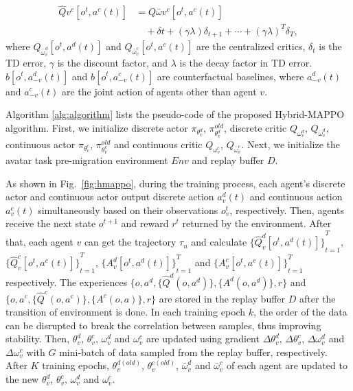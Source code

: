 \documentclass[lettersize,journal]{IEEEtran}
\begin{document}
\begin{equation}
\begin{aligned}
\hat{Q}v^c[o^t, a^c(t)] &= Q{\bar{\omega}v^c}[o^t, a^c(t)] \\
& \quad +\delta{t}+(\gamma \lambda) \delta_{t+1}+\cdots+(\gamma \lambda)^{T} \delta_{T},\label{hatqc}
\end{aligned}
\end{equation}
where $Q_{\bar{\omega}_v^d}[o^t, a^d(t)]$ and $Q_{\bar{\omega}_v^c}[o^t, a^c(t)]$ are the centralized critics, $\delta_{t}$ is the TD error, $\gamma$ is the discount factor, and $\lambda$ is the decay factor in TD error. $b[o^t, a^d_{-v}(t)]$ and $b[o^t, a^c_{-v}(t)]$ are counterfactual baselines, where $a^d_{-v}(t)$ and $a^c_{-v}(t)$ are the joint action of agents other than agent $v$.



Algorithm \ref{alg:algorithm} lists the pseudo-code of the proposed Hybrid-MAPPO algorithm. First, we initialize discrete actor $\pi_{\theta_v^d}$, $\pi_{\theta_v^d}^{old}$, discrete critic $Q_{\omega_v^d}$, $Q_{\bar{\omega}_v^d}$, continuous actor $\pi_{\theta_v^c}$, $\pi_{\theta_v^c}^{old}$ and continuous critic $Q_{\omega_v^c}$, $Q_{{\overline{\omega}}_v^c}$. Next, we initialize the avatar task pre-migration environment $Env$ and replay buffer $D$.

As shown in Fig.~\ref{fig:hmappo}, during the training process, each agent's discrete actor and continuous actor output discrete action $a_v^d(t)$ and continuous action $a_v^c(t)$ simultaneously based on their observations $o^t_v$, respectively. Then, agents receive the next state $o^{t+1}$ and reward $r^t$ returned by the environment. After that, each agent $v$ can get the trajectory $\tau_u$ and calculate ${\{\hat{Q}_v^d[o^t,a^d(t)]\}}_{t=1}^{T}$, ${\{\hat{Q}_v^c[o^t,a^c(t)]\}}_{t=1}^{T}$, ${\{A_v^d[o^t,a^d(t)]\}}_{t=1}^{T}$ and ${\{A_v^c[o^t,a^c(t)]\}}_{t=1}^{T}$ respectively. The experiences ${\{o,a^d,\{\hat{Q}^d(o,a^d)\},\{A^d(o,a^d)\},r\}}$ and ${\{o,a^c,\{\hat{Q}^c(o,a^c)\},\{A^c(o,a)\},r\}}$ are stored in the replay buffer $D$ after the transition of environment is done. In each training epoch $k$, the order of the data can be disrupted to break the correlation between samples, thus improving stability. Then, $\theta_v^d$, $\theta_v^c$, $\omega_v^d$ and $\omega_v^c$ are updated using gradient $\Delta\theta_v^d$, $\Delta\theta_v^c$, $\Delta\omega_v^d$ and $\Delta\omega_v^c$ with $G$ mini-batch of data sampled from the replay buffer, respectively. After $K$ training epochs, $\theta_v^{d(old)}$, $\theta_v^{c(old)}$, $\bar{\omega}_v^d$ and $\bar{\omega}_v^c$ of each agent are updated to the new $\theta_v^{d}$, $\theta_v^{c}$, ${\omega}_v^d$ and ${\omega}_v^c$. 
\end{document}
